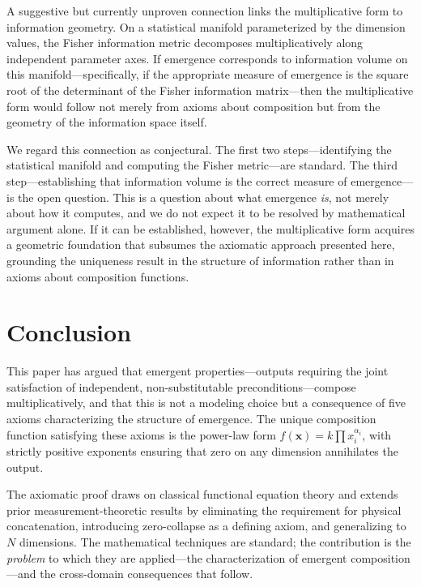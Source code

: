 \documentclass[12pt, a4paper]{article}
\theoremstyle{definition}
\theoremstyle{remark}
\begin{document}
A suggestive but currently unproven connection links the multiplicative form to information geometry. On a statistical manifold parameterized by the dimension values, the Fisher information metric decomposes multiplicatively along independent parameter axes. If emergence corresponds to information volume on this manifold---specifically, if the appropriate measure of emergence is the square root of the determinant of the Fisher information matrix---then the multiplicative form would follow not merely from axioms about composition but from the geometry of the information space itself.

We regard this connection as conjectural. The first two steps---identifying the statistical manifold and computing the Fisher metric---are standard. The third step---establishing that information volume is the correct measure of emergence---is the open question. This is a question about what emergence \textit{is}, not merely about how it computes, and we do not expect it to be resolved by mathematical argument alone. If it can be established, however, the multiplicative form acquires a geometric foundation that subsumes the axiomatic approach presented here, grounding the uniqueness result in the structure of information rather than in axioms about composition functions.


\section{Conclusion}\label{sec:conclusion}

This paper has argued that emergent properties---outputs requiring the joint satisfaction of independent, non-substitutable preconditions---compose multiplicatively, and that this is not a modeling choice but a consequence of five axioms characterizing the structure of emergence. The unique composition function satisfying these axioms is the power-law form $f(\mathbf{x}) = k \prod x_i^{\alpha_i}$, with strictly positive exponents ensuring that zero on any dimension annihilates the output.

The axiomatic proof draws on classical functional equation theory \cite{aczel1966} and extends prior measurement-theoretic results \cite{luce1965} by eliminating the requirement for physical concatenation, introducing zero-collapse as a defining axiom, and generalizing to $N$ dimensions. The mathematical techniques are standard; the contribution is the \textit{problem} to which they are applied---the characterization of emergent composition---and the cross-domain consequences that follow.
\end{document}
